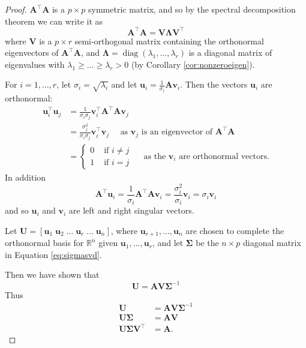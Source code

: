 \documentclass[
]{book}
\theoremstyle{definition}
\theoremstyle{definition}
\theoremstyle{definition}
\theoremstyle{definition}
\theoremstyle{remark}
\begin{document}
\begin{proof}
\(\mathbf A^\top \mathbf A\) is a \(p\times p\) symmetric matrix, and so by the spectral decomposition theorem we can write it as \[\mathbf A^\top \mathbf A= \mathbf V\boldsymbol \Lambda\mathbf V^\top\]
where \(\mathbf V\) is a \(p \times r\) semi-orthogonal matrix containing the orthonormal eigenvectors of \(\mathbf A^\top \mathbf A\), and \(\boldsymbol \Lambda=\operatorname{diag}(\lambda_1, \ldots, \lambda_r)\) is a diagonal matrix of eigenvalues with \(\lambda_1\geq \ldots \geq\lambda_r>0\) (by Corollary \ref{cor:nonzeroeigen}).

For \(i=1,\dots, r\), let \(\sigma_i =\sqrt{\lambda_i}\) and let \(\mathbf u_i = \frac{1}{\sigma_i} \mathbf A\mathbf v_i\). Then the vectors \(\mathbf u_i\) are orthonormal:
\begin{align*}
\mathbf u_i^\top \mathbf u_j &=\frac{1}{\sigma_i\sigma_j} \mathbf v_i^\top \mathbf A^\top\mathbf A\mathbf v_j\\
&=\frac{\sigma_j^2}{\sigma_i\sigma_j} \mathbf v_i^\top\mathbf v_j \quad \mbox{ as }\mathbf v_j \mbox{ is an eigenvector of } \mathbf A^\top\mathbf A\\
&=\begin{cases}
0 &\mbox{ if } i\not=j\\
1 &\mbox{ if } i=j
\end{cases}\quad \mbox{ as the } \mathbf v_i \mbox{ are orthonormal vectors.}
\end{align*}
In addition
\[\mathbf A^\top\mathbf u_i = \frac{1}{\sigma_i}\mathbf A^\top\mathbf A\mathbf v_i = \frac{\sigma^2_i}{\sigma_i}\mathbf v_i = \sigma_i\mathbf v_i\]
and so \(\mathbf u_i\) and \(\mathbf v_i\) are left and right singular vectors.

Let \(\mathbf U=[\mathbf u_1 \; \mathbf u_2 \; \ldots \; \mathbf u_r\; \ldots \; \mathbf u_n]\), where \(\mathbf u_{r+1}, \ldots, \mathbf u_n\) are chosen to complete the orthonormal basis for \(\mathbb{R}^n\) given \(\mathbf u_1, \ldots, \mathbf u_r\), and
let \(\boldsymbol{\Sigma}\) be the \(n\times p\) diagonal matrix in Equation \eqref{eq:sigmasvd}.

Then we have shown that
\[\mathbf U= \mathbf A\mathbf V\boldsymbol{\Sigma}^{-1}\]
Thus
\begin{align*}
\mathbf U&= \mathbf A\mathbf V\boldsymbol{\Sigma}^{-1}\\
\mathbf U\boldsymbol{\Sigma}&= \mathbf A\mathbf V\\
\mathbf U\boldsymbol{\Sigma}\mathbf V^\top &= \mathbf A.
\end{align*}
\end{proof}
\end{document}
